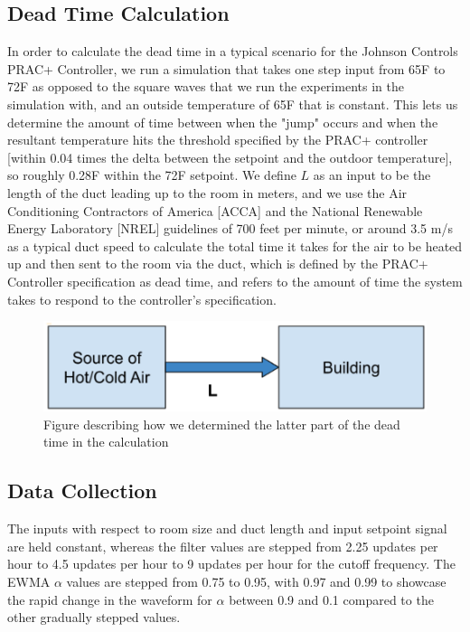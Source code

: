 \documentclass[conference,letterpaper]{IEEEtran}
\begin{document}
\subsection{Dead Time Calculation}
\label{sec: Dead Time Calculation}
In order to calculate the dead time in a typical scenario for the Johnson Controls PRAC+ Controller, we run a simulation that takes one step input from 65\degree F to 72\degree F as opposed to the square waves that we run the experiments in the simulation with, and an outside temperature of 65\degree F that is constant. This lets us determine the amount of time between when the "jump" occurs and when the resultant temperature hits the threshold specified by the PRAC+ controller [within 0.04 times the delta between the setpoint and the outdoor temperature], so roughly 0.28\degree F within the 72\degree F setpoint. We define $L$ as an input to be the length of the duct leading up to the room in meters, and we use the Air Conditioning Contractors of America [ACCA] and the National Renewable Energy Laboratory [NREL] guidelines of 700 feet per minute, or around 3.5 m/s \cite{Burdick2011} as a typical duct speed to calculate the total time it takes for the air to be heated up and then sent to the room via the duct, which is defined by the PRAC+ Controller specification as dead time, and refers to the amount of time the system takes to respond to the controller's specification.

\begin{figure}
\includegraphics[scale=0.5]{length.png}
    \caption{Figure describing how we determined the latter part of the dead time in the calculation}
\end{figure}


\subsection{Data Collection}
\label{sec: Data Collection}
The inputs with respect to room size and duct length and input setpoint signal are held constant, whereas the filter values are stepped from 2.25 updates per hour to 4.5 updates per hour to 9 updates per hour for the cutoff frequency. The EWMA $\alpha$ values are stepped from 0.75 to 0.95, with 0.97 and 0.99 to showcase the rapid change in the waveform for $\alpha$ between 0.9 and 0.1 compared to the other gradually stepped values. 
\end{document}
